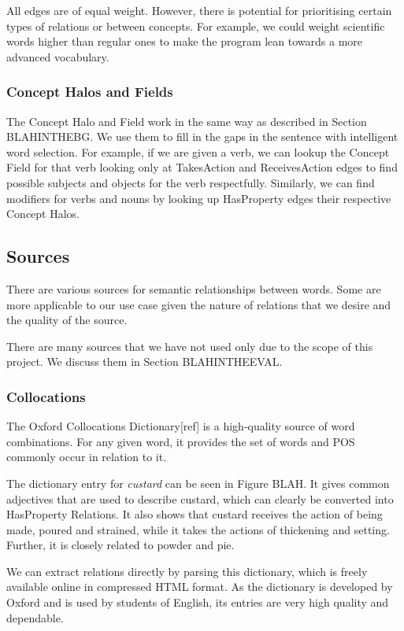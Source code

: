All edges are of equal weight. However, there is potential for prioritising certain types of relations or between concepts. For example, we could weight scientific words higher than regular ones to make the program lean towards a more advanced vocabulary.


\subsubsection{Concept Halos and Fields}

The Concept Halo and Field work in the same way as described in Section BLAHINTHEBG. We use them to fill in the gaps in the sentence with intelligent word selection. For example, if we are given a verb, we can lookup the Concept Field for that verb looking only at TakesAction and ReceivesAction edges to find possible subjects and objects for the verb respectfully. Similarly, we can find modifiers for verbs and nouns by looking up HasProperty edges their respective Concept Halos.

\subsection{Sources}
There are various sources for semantic relationships between words. Some are more applicable to our use case given the nature of relations that we desire and the quality of the source.

There are many sources that we have not used only due to the scope of this project. We discuss them in Section BLAHINTHEEVAL.

\subsubsection{Collocations}
The Oxford Collocations Dictionary[ref] is a high-quality source of word combinations. For any given word, it provides the set of words and POS commonly occur in relation to it.

The dictionary entry for \textit{custard} can be seen in Figure BLAH. It gives common adjectives that are used to describe custard, which can clearly be converted into HasProperty Relations. It also shows that custard receives the action of being made, poured and strained, while it takes the actions of thickening and setting. Further, it is closely related to powder and pie.

We can extract relations directly by parsing this dictionary, which is freely available online in compressed HTML format. As the dictionary is developed by Oxford and is used by students of English, its entries are very high quality and dependable.

